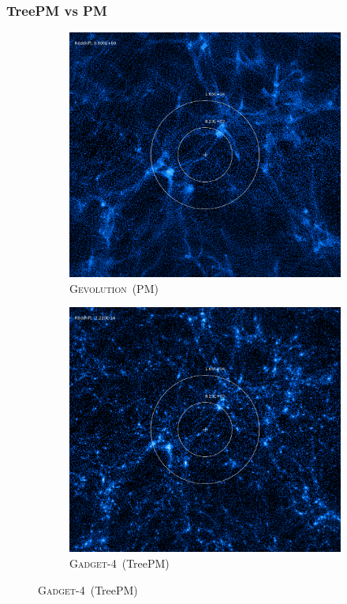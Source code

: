 \documentclass{beamer}
\makeatletter
\newcommand{\mylabel}{%
}
\newcommand{\gadget}{\textsc{Gadget-4}}
\newcommand{\gevolution}{\textsc{Gevolution}}
\makeatother
\begin{document}

\begin{frame}[label=pmvstreepm]
    \frametitle{TreePM vs PM\mylabel}
    \begin{figure}
        \begin{subfigure}[b]{.49\textwidth}
        \includegraphics[width=\textwidth]{images/gevolution-z0.png}%
        \caption{\gevolution\ (PM)}
        \end{subfigure}
        \begin{subfigure}[b]{.49\textwidth}
        \includegraphics[width=\textwidth]{images/gadget-z0.png}%
        \caption{\gadget\ (TreePM)}
        \end{subfigure}
    \end{figure}
\end{frame}
\end{document}

